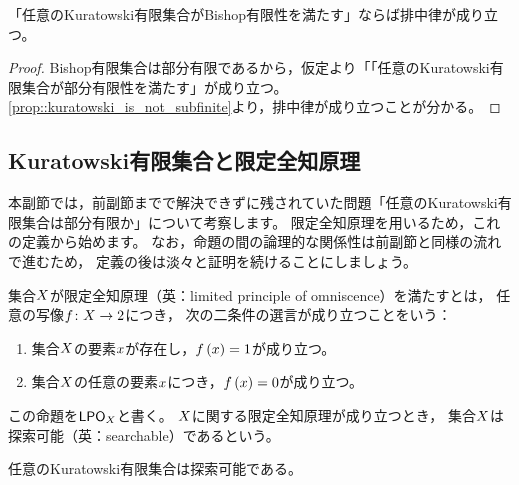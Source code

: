 \begin{proposition}\label{prop::kuratowski_is_not_bishop}
    「任意のKuratowski有限集合がBishop有限性を満たす」ならば排中律が成り立つ。
\end{proposition}

\begin{proof}
    Bishop有限集合は部分有限であるから，仮定より「「任意のKuratowski有限集合が部分有限性を満たす」が成り立つ。
    \cref{prop::kuratowski_is_not_subfinite}より，排中律が成り立つことが分かる。
\end{proof}

\subsection{Kuratowski有限集合と限定全知原理}

本副節では，前副節までで解決できずに残されていた問題「任意のKuratowski有限集合は部分有限か」について考察します。
限定全知原理を用いるため，これの定義から始めます。
なお，命題の間の論理的な関係性は前副節と同様の流れで進むため，
定義の後は淡々と証明を続けることにしましょう。

\begin{definition}
    集合\(\Set\)が限定全知原理（英：limited principle of omniscence）を満たすとは，
    任意の写像\(\FunctionStyle{\Map}{\Set}{\NaturalNumber<2>}\)につき，
    次の二条件の選言が成り立つことをいう：
    \begin{enumerate}
        \item 集合\(\Set\)の要素\(\Element\)が存在し，\(\Map(\Element)=\NaturalNumber<1>\)が成り立つ。
        \item 集合\(\Set\)の任意の要素\(\Element\)につき，\(\Map(\Element)=\NaturalNumber<0>\)が成り立つ。
    \end{enumerate}
    この命題を\(\LPO_{\Set}\)と書く。
    \(\Set\)に関する限定全知原理が成り立つとき，
    集合\(\Set\)は探索可能（英：searchable）であるという。
\end{definition}

\begin{proposition}\label{prop::all_kuratowski_finite_has_searchability}
    任意のKuratowski有限集合は探索可能である。
\end{proposition}

